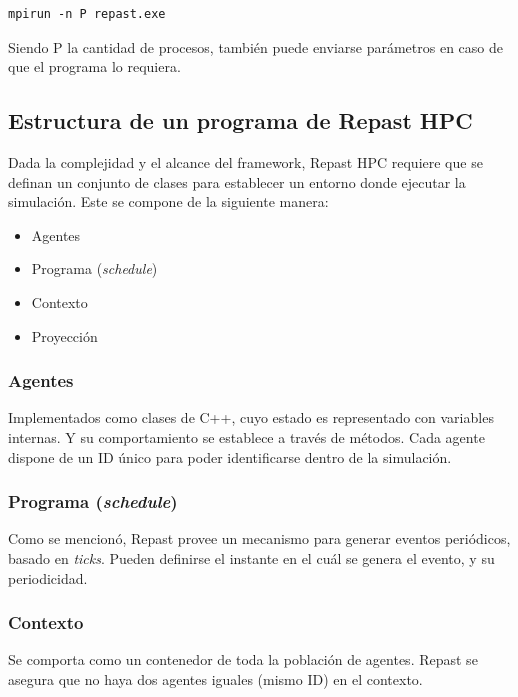 \begin{verbatim}
mpirun -n P repast.exe
\end{verbatim}

Siendo P la cantidad de procesos, también puede enviarse parámetros en
caso de que el programa lo requiera.

\subsection{Estructura de un programa de Repast HPC}

Dada la complejidad y el alcance del framework, Repast HPC requiere que
se definan un conjunto de clases para establecer un entorno donde
ejecutar la simulación. Este se compone de la siguiente manera:

\begin{itemize}
	\tightlist
	\item
	Agentes
	\item
	Programa (\emph{schedule})
	\item
	Contexto
	\item
	Proyección
\end{itemize}

\subsubsection{Agentes}

Implementados como clases de C++, cuyo estado es representado con
variables internas. Y su comportamiento se establece a través de
métodos. Cada agente dispone de un ID único para poder identificarse
dentro de la simulación.

\subsubsection{\texorpdfstring{Programa
		(\emph{schedule})}{Programa (schedule)}}

Como se mencionó, Repast provee un mecanismo para generar eventos
periódicos, basado en \emph{ticks}. Pueden definirse el instante en el
cuál se genera el evento, y su periodicidad.

\subsubsection{Contexto}

Se comporta como un contenedor de toda la población de agentes. Repast
se asegura que no haya dos agentes iguales (mismo ID) en el contexto.

